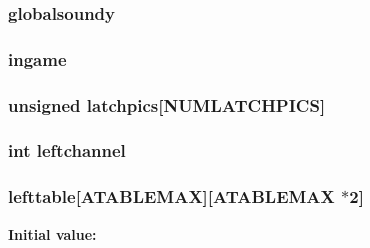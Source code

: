 \label{WL__GAME_8C_aa6ef54cae097d6dcf5978bfb47878b38}
\hypertarget{WL__GAME_8C_a6449802efb1ebe896474ec55a38dbdd2}{
\subsubsection[{globalsoundy}]{ {\bf globalsoundy}}}
\label{WL__GAME_8C_a6449802efb1ebe896474ec55a38dbdd2}
\hypertarget{WL__GAME_8C_aa5cd2906ddbef01eb4893f711504c438}{
\subsubsection[{ingame}]{ {\bf ingame}}}
\label{WL__GAME_8C_aa5cd2906ddbef01eb4893f711504c438}
\hypertarget{WL__GAME_8C_adbe64e9f4cdaee2e69ce2b915bd5c9ff}{
\subsubsection[{latchpics}]{\setlength{\rightskip}{0pt plus 5cm}unsigned {\bf latchpics}\mbox{[}NUMLATCHPICS\mbox{]}}}
\label{WL__GAME_8C_adbe64e9f4cdaee2e69ce2b915bd5c9ff}
\hypertarget{WL__GAME_8C_ab6aa6dd4038aac44d98f4a49f4eac7e6}{
\subsubsection[{leftchannel}]{\setlength{\rightskip}{0pt plus 5cm}int {\bf leftchannel}}}
\label{WL__GAME_8C_ab6aa6dd4038aac44d98f4a49f4eac7e6}
\hypertarget{WL__GAME_8C_a784485413ec292eed3fe8f5f5d48a479}{
\subsubsection[{lefttable}]{ {\bf lefttable}\mbox{[}ATABLEMAX\mbox{]}\mbox{[}ATABLEMAX $\ast$2\mbox{]}}}
\label{WL__GAME_8C_a784485413ec292eed3fe8f5f5d48a479}
{\bfseries Initial value:}
